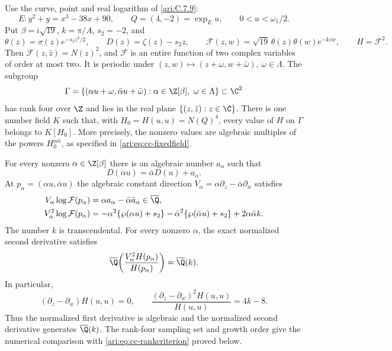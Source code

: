 \begin{proposition}\hypertarget{tag-0019}{}\label{ari:C.7.11}

Use the curve, point and real logarithm of \ref{ari:C.7.9}:
\[
 E:y^2+y=x^3-38x+90,\qquad Q=(4,-2)=\exp_Eu,
 \qquad 0<u<\omega_1/2.
\]
Put $\beta=i\sqrt{19}$, $k=\pi/A$, $s_2=-2$, and
\[
 \theta(z)=\sigma(z)e^{-s_2z^2/2},\qquad
 D(z)=\zeta(z)-s_2z,\qquad
 \mathcal F(z,w)=\sqrt{19}\,\theta(z)\theta(w)e^{-kzw},
 \qquad H=\mathcal F^2.
\]
Then $\mathcal F(z,\bar z)=N(z)^2$, and $\mathcal F$ is an
entire function of two complex variables of order at most two.
It is periodic under $(z,w)\mapsto(z+\omega,w+\bar\omega)$,
$\omega\in\Lambda$. The subgroup
\[
 \Gamma=\{(\alpha u+\omega,\bar\alpha u+\bar\omega):
                   \alpha\in\Z[\beta],\ \omega\in\Lambda\}
 \subset\C^2
\]
has rank four over $\Z$ and lies in the real plane
$\{(z,\bar z):z\in\C\}$. There is one number field $K$ such
that, with $H_0=H(u,u)=N(Q)^4$, every value of $H$ on
$\Gamma$ belongs to $K[H_0]$. More precisely, the nonzero values
are algebraic multiples of the powers $H_0^{\alpha\bar\alpha}$,
as specified in \eqref{ari:eq:cc-fixedfield}.

For every nonzero $\alpha\in\Z[\beta]$ there is an algebraic
number $a_\alpha$ such that
\[
 D(\alpha u)=\bar\alpha D(u)+a_\alpha.
\]
At $p_\alpha=(\alpha u,\bar\alpha u)$ the algebraic constant
direction $V_\alpha=\alpha\partial_z-\bar\alpha\partial_w$
satisfies
\begin{align*}
 V_\alpha\log\mathcal F(p_\alpha)
    &=\alpha a_\alpha-\bar\alpha\bar a_\alpha
                         \in\overline{\Q},\\
 V_\alpha^2\log\mathcal F(p_\alpha)
    &=-\alpha^2\{\wp(\alpha u)+s_2\}
      -\bar\alpha^2\{\wp(\bar\alpha u)+s_2\}
      +2\alpha\bar\alpha k.
\end{align*}
The number $k$ is transcendental. For every nonzero $\alpha$,
the exact normalized second derivative satisfies
\[
 \overline\Q\!\left(\frac{V_\alpha^2H(p_\alpha)}{H(p_\alpha)}\right)
      =\overline\Q(k).
\] In particular,
\[
 (\partial_z-\partial_w)H(u,u)=0,\qquad
 \frac{(\partial_z-\partial_w)^2H(u,u)}{H(u,u)}=4k-8.
\]
Thus the normalized first derivative is algebraic and the
normalized second derivative generates $\overline\Q(k)$. The rank-four sampling set and growth order give the numerical
comparison with \eqref{ari:eq:cc-rankcriterion} proved below.
\end{proposition}



